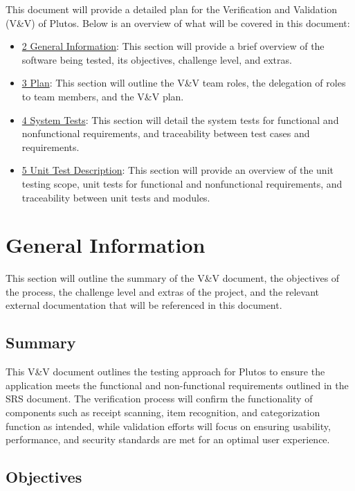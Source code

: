 \documentclass[12pt, titlepage]{article}
\begin{document}
\newpage


This document will provide a detailed plan for the Verification and Validation
(V\&V) of Plutos. Below is an overview of what will be covered in this document:
\begin{itemize}
	\item \hyperlink{section.2}{2 General Information}: This section will provide a brief overview of
	the software being tested, its objectives, challenge level, and extras.
	\item \hyperlink{section.3}{3 Plan}: This section will outline the V\&V team roles, the delegation
	of roles to team members, and the V\&V plan.
	\item \hyperlink{section.4}{4 System Tests}: This section will detail the system tests for
	functional and nonfunctional requirements, and traceability between test
	cases and requirements.
	\item \hyperlink{section.5}{5 Unit Test Description}: This section will provide an overview of the
	unit testing scope, unit tests for functional and nonfunctional
	requirements, and traceability between unit tests and modules.
\end{itemize}


\newpage

\section{General Information}

This section will outline the summary of the V\&V document, the objectives of
the process, the challenge level and extras of the project, and the relevant
external documentation that will be referenced in this document.

\subsection{Summary}

This V\&V document outlines the testing approach for Plutos to ensure the
application meets the functional and non-functional requirements outlined in the
SRS document. The verification process will confirm the functionality of
components such as receipt scanning, item recognition, and categorization
function as intended, while validation efforts will focus on ensuring usability,
performance, and security standards are met for an optimal user experience.


\subsection{Objectives}
\end{document}
